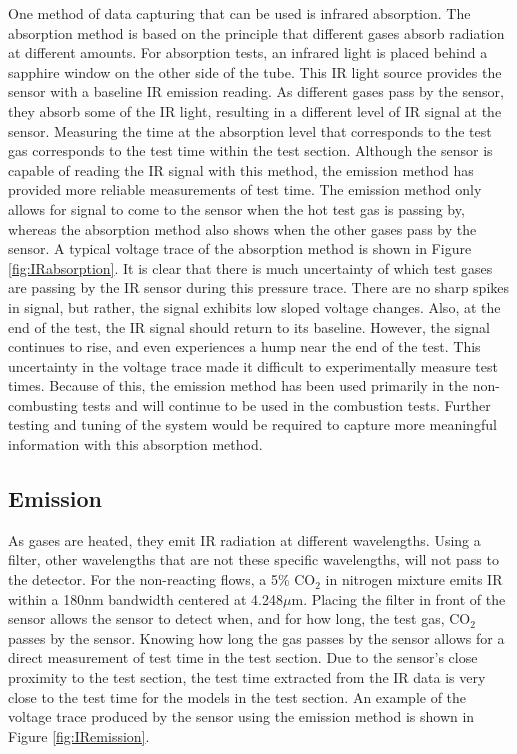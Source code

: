 One method of data capturing that can be used is infrared absorption. The absorption method is based on the principle that different gases absorb radiation at different amounts. For absorption tests, an infrared light is placed behind a sapphire window on the other side of the tube. This IR light source provides the sensor with a baseline IR emission reading. As different gases pass by the sensor, they absorb some of the IR light, resulting in a different level of IR signal at the sensor. Measuring the time at the absorption level that corresponds to the test gas corresponds to the test time within the test section. Although the sensor is capable of reading the IR signal with this method, the emission method has provided more reliable measurements of test time. The emission method only allows for signal to come to the sensor when the hot test gas is passing by, whereas the absorption method also shows when the other gases pass by the sensor. A typical voltage trace of the absorption method is shown in Figure \ref{fig:IRabsorption}. It is clear that there is much uncertainty of which test gases are passing by the IR sensor during this pressure trace. There are no sharp spikes in signal, but rather, the signal exhibits low sloped voltage changes. Also, at the end of the test, the IR signal should return to its baseline. However, the signal continues to rise, and even experiences a hump near the end of the test. This uncertainty in the voltage trace made it difficult to experimentally measure test times. Because of this, the emission method has been used primarily in the non-combusting tests and will continue to be used in the combustion tests. Further testing and tuning of the system would be required to capture more meaningful information with this absorption method. 



\subsection{Emission}

As gases are heated, they emit IR radiation at different wavelengths. Using a filter, other wavelengths that are not these specific wavelengths, will not pass to the detector. For the non-reacting flows, a 5\% CO$_2$ in nitrogen mixture emits IR within a 180nm bandwidth centered at 4.248$\mu$m. Placing the filter in front of the sensor allows the sensor to detect when, and for how long, the test gas, CO$_2$ passes by the sensor. Knowing how long the gas passes by the sensor allows for a direct measurement of test time in the test section. Due to the sensor's close proximity to the test section, the test time extracted from the IR data is very close to the test time for the models in the test section. An example of the voltage trace produced by the sensor using the emission method is shown in Figure \ref{fig:IRemission}. 



